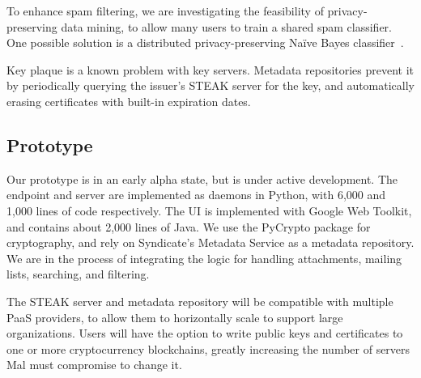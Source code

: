 To enhance spam filtering, we are investigating the feasibility of privacy-preserving data mining, to allow many users to train a shared spam classifier.  One possible solution is a distributed privacy-preserving Na\"{i}ve Bayes classifier~\cite{privacy-preserving-naive-bayes}.

Key plaque is a known problem with key servers.  Metadata repositories prevent it by periodically querying the issuer's STEAK server for the key, and automatically erasing certificates with built-in expiration dates.

\subsection{Prototype}
Our prototype is in an early alpha state, but is under active development.  The endpoint and server are implemented as daemons in Python, with 6,000 and 1,000 lines of code respectively.  The UI is implemented with Google Web Toolkit, and contains about 2,000 lines of Java. We use the PyCrypto package for cryptography, and rely on Syndicate’s Metadata Service as a metadata repository.  We are in the process of integrating the logic for handling attachments, mailing lists, searching, and filtering.

The STEAK server and metadata repository will be compatible with multiple PaaS providers, to allow them to horizontally scale to support large organizations.  Users will have the option to write public keys and certificates to one or more cryptocurrency blockchains, greatly increasing the number of servers Mal must compromise to change it.
